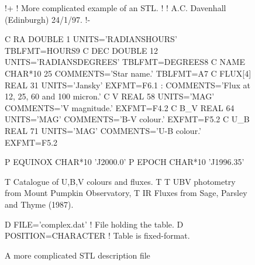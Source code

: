 \documentclass[twoside,11pt]{starlink}
\begin{document}
\begin{figure}[htbp]


\begin{terminalv}
!+
! More complicated example of an STL.
!
! A.C. Davenhall (Edinburgh) 24/1/97.
!-

C RA      DOUBLE    1  UNITS='RADIANS{HOURS}'    TBLFMT=HOURS9
C DEC     DOUBLE   12  UNITS='RADIANS{DEGREES}'  TBLFMT=DEGREES8
C NAME    CHAR*10  25  COMMENTS='Star name.'     TBLFMT=A7
C FLUX[4] REAL     31  UNITS='Jansky'            EXFMT=F6.1
:           COMMENTS='Flux at 12, 25, 60 and 100 micron.'
C V       REAL     58  UNITS='MAG'  COMMENTS='V magnitude.' EXFMT=F4.2
C B_V     REAL     64  UNITS='MAG'  COMMENTS='B-V colour.'  EXFMT=F5.2
C U_B     REAL     71  UNITS='MAG'  COMMENTS='U-B colour.'  EXFMT=F5.2

P EQUINOX  CHAR*10  'J2000.0'
P EPOCH    CHAR*10  'J1996.35'

T Catalogue of U,B,V colours and fluxes.
T
T UBV photometry from Mount Pumpkin Observatory,
T IR Fluxes from Sage, Parsley and Thyme (1987).

D FILE='complex.dat'      ! File holding the table.
D POSITION=CHARACTER      ! Table is fixed-format.
\end{terminalv}

\caption{A more complicated STL description file\label{DESCR_COMP} }

\end{figure}
\end{document}
